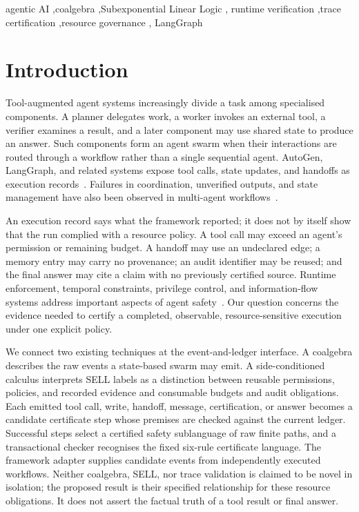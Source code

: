 \documentclass[a4paper,fleqn]{cas-sc}
\begin{document}
\begin{keywords}
agentic AI \sep coalgebra \sep Subexponential Linear Logic \sep
runtime verification \sep trace certification \sep resource governance \sep
LangGraph
\end{keywords}

\maketitle

\section{Introduction}

Tool-augmented agent systems increasingly divide a task among specialised
components. A planner delegates work, a worker invokes an external tool, a
verifier examines a result, and a later component may use shared state to
produce an answer. Such components form an agent swarm when their interactions
are routed through a workflow rather than a single sequential agent. AutoGen,
LangGraph, and related systems expose tool calls, state updates, and handoffs as
execution records~\cite{wu2024autogen,li2024survey,langgraph2026handoffs}.
Failures in coordination, unverified outputs, and state management have also
been observed in multi-agent workflows~\cite{cemri2025mast}.

An execution record says what the framework reported; it does not by itself
show that the run complied with a resource policy. A tool call may exceed an
agent's permission or remaining budget. A handoff may use an undeclared edge;
a memory entry may carry no provenance; an audit identifier may be reused; and
the final answer may cite a claim with no previously certified source. Runtime
enforcement, temporal constraints, privilege control, and information-flow
systems address important aspects of agent safety~\cite{wang2026agentspec,
kamath2025agentc,shi2025progent,
debenedetti2026camel,costa2025fides}. Our question concerns the evidence needed
to certify a completed, observable, resource-sensitive execution under one
explicit policy.

We connect two existing techniques at the event-and-ledger interface. A
coalgebra describes the raw events a state-based swarm may emit. A
side-conditioned calculus interprets SELL labels as a distinction between
reusable permissions, policies, and recorded evidence and consumable budgets
and audit obligations. Each emitted tool call, write, handoff, message,
certification, or answer becomes a candidate certificate step whose premises
are checked against the current ledger. Successful steps select a certified
safety sublanguage of raw finite paths, and a transactional checker recognises
the fixed six-rule certificate language. The framework adapter supplies
candidate events from independently executed workflows. Neither coalgebra,
SELL, nor trace validation is claimed to be novel in isolation; the proposed
result is their specified relationship for these resource obligations. It does
not assert the factual truth of a tool result or final answer.
\end{document}
